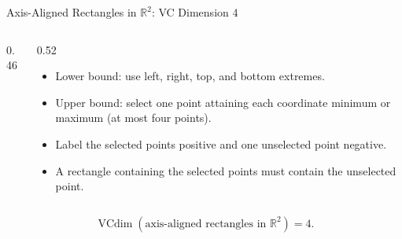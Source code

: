 \documentclass[aspectratio=169,10pt]{beamer}
\newcommand{\vcdim}{\operatorname{VCdim}}
\begin{document}
\begin{frame}[t]{Axis-Aligned Rectangles in $\mathbb{R}^2$: VC Dimension $4$}
  \vspace{0.01cm}
  \begin{columns}[T,totalwidth=\textwidth]
    \begin{column}{0.46\textwidth}
      \begin{center}
      \end{center}
    \end{column}
    \begin{column}{0.52\textwidth}
      {\small
      \begin{itemize}
        \setlength{\itemsep}{0.10cm}
        \item Lower bound: use left, right, top, and bottom extremes.
        \item Upper bound: select one point attaining each coordinate minimum or maximum (at most four points).
        \item Label the selected points positive and one unselected point negative.
        \item A rectangle containing the selected points must contain the unselected point.
      \end{itemize}}
    \end{column}
  \end{columns}
  \vspace{0.01cm}
  \[
    \boxed{\vcdim(\text{axis-aligned rectangles in }\mathbb{R}^2)=4.}
  \]
\end{frame}
\end{document}
